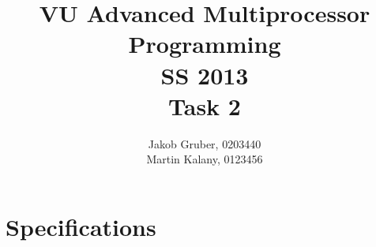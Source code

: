 \documentclass[a4paper,10pt]{article}
\title{VU Advanced Multiprocessor Programming \\
       SS 2013 \\
       Task 2}
\author{Jakob Gruber, 0203440 \\
        Martin Kalany, 0123456}
\begin{document}
\maketitle

\tableofcontents

\pagebreak

\section{Specifications}

\begin{comment}
* Good theoretical analysis (invariants, linearizability, progress guarantees).
* Good benchmark analysis.
* Short document: 2-4 pages excluding plots and sourcecode. Description of data
  structure. Theoretical analysis. Benchmark (results, process).

A couple of notes:

Remove doesn't compact the set. In fact, I think it's impossible to *know* when
a compaction is possible since it depends on the hash functions.

The refined set does not delete old mutex collections until the set is deleted.
This results in a little memory overhead but is necessary because we can't
simply delete old lock sets (other threads might still be accessing them). We
tried reference counting, but it ended up as the bottleneck for >~4 threads.

For the same reason (= no garbage collection), we also had to introduce a
global lock in relocate() to protect ProbeSets from being deleted while still
in use.

The Go implementation doesn't need either of these crutches. It's also designed
to work without reentrant locks and thread ids.
\end{comment}
\end{document}
